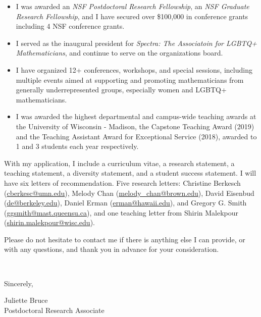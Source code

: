 \documentclass[11pt]{article}
\begin{document}
\begin{itemize}[leftmargin=*]
\item I was awarded an \textit{NSF Postdoctoral Research Fellowship}, an \textit{NSF Graduate Research Fellowship}, and I have secured over \$100,000 in conference grants including 4 NSF conference grants. 
\item I served as the inaugural president for \textit{Spectra: The Associatoin for LGBTQ+ Mathematicians}, and continue to serve on the organizations board. 
\item I have organized 12+ conferences, workshops, and special sessions, including multiple events aimed at supporting and promoting mathematicians from generally underrepresented groups, especially women and LGBTQ+ mathematicians. 
\item I was awarded the highest departmental and campus-wide teaching awards at the University of Wisconsin - Madison, the Capstone Teaching Award (2019) and the Teaching Assistant Award for Exceptional Service (2018), awarded to 1 and 3 students each year respectively. 
\end{itemize}

With my application, I include a curriculum vitae, a research statement, a teaching statement, a diversity statement, and a student success statement.  I will have six letters of recommendation. Five research letters: Christine Berkesch (\href{mailto:cberkesc@umn.edu}{cberkesc@umn.edu}), Melody Chan (\href{mailto:melody\_chan@brown.edu}{melody\_chan@brown.edu}), David Eisenbud  (\href{mailto:de@berkeley.edu
}{de@berkeley.edu}), Daniel Erman (\href{mailto:erman@hawaii.edu}{erman@hawaii.edu}), and Gregory G. Smith (\href{mailto:ggsmith@mast.queensu.ca}{ggsmith@mast.queensu.ca}), and one teaching letter from Shirin Malekpour (\href{mailto:shirin.malekpour@wisc.edu}{shirin.malekpour@wisc.edu}).  


Please do not hesitate to contact me if there is anything else I can provide, or with any questions, and thank you in advance for your consideration. 

\vspace{24pt}
\noindent
\begin{minipage}{0.99\textwidth}
\begin{minipage}{0.69\textwidth}
\textcolor{white}{.}
\end{minipage}
\begin{minipage}{0.29\textwidth}
Sincerely, 

\vspace{36pt}
Juliette Bruce\\
Postdoctoral Research Associate\end{minipage}
\end{minipage}

\end{document}
